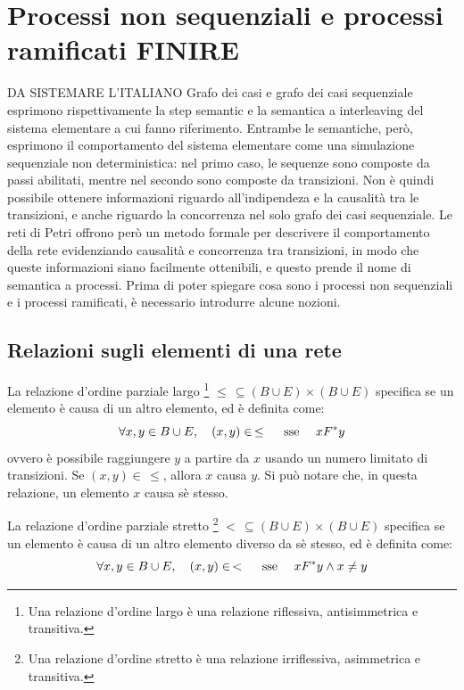 \section{Processi non sequenziali e processi ramificati FINIRE}
DA SISTEMARE L'ITALIANO
Grafo dei casi e grafo dei casi sequenziale esprimono rispettivamente
la step semantic e la semantica a interleaving del sistema elementare
a cui fanno riferimento.
Entrambe le semantiche, però, esprimono il comportamento del sistema
elementare come una simulazione sequenziale non deterministica: nel primo caso,
le sequenze sono composte da passi abilitati, mentre nel secondo sono composte
da transizioni. Non è quindi possibile ottenere informazioni riguardo
all'indipendeza e la causalità tra le transizioni, e anche riguardo la
concorrenza nel solo grafo dei casi sequenziale.
Le reti di Petri offrono però un metodo formale per descrivere il comportamento
della rete evidenziando causalità e concorrenza tra transizioni, in modo
che queste informazioni siano facilmente ottenibili, e questo prende
il nome di semantica a processi.
Prima di poter spiegare cosa sono i processi non sequenziali e i processi
ramificati, è necessario introdurre alcune nozioni.

\subsection*{Relazioni sugli elementi di una rete}
\begin{defn}
    La relazione d'ordine parziale largo \footnote{Una relazione d'ordine largo
    è una relazione riflessiva, antisimmetrica e transitiva.}
    $\le \, \subseteq (B \cup E) \times (B \cup E)$ specifica se un elemento
    è causa di un altro elemento, ed è definita come:
    \[
        \forall x, y \in B \cup E, \quad (x, y) \in \, \le \quad
        \textnormal{ sse } \quad x F^*y
    \]
    ovvero è possibile raggiungere $y$ a partire da $x$ usando un numero
    limitato di transizioni. Se $(x,y) \in \, \le$, allora $x$ causa $y$.
    Si può notare che, in questa relazione, un elemento $x$ causa sè stesso.
\end{defn}

\begin{defn}
    La relazione d'ordine parziale stretto \footnote{Una relazione d'ordine
    stretto è una relazione irriflessiva, asimmetrica e transitiva.}
    $< \, \subseteq (B \cup E) \times (B \cup E)$ specifica se un elemento
    è causa di un altro elemento diverso da sè stesso, ed è definita come:
    \[
        \forall x, y \in B \cup E, \quad (x, y) \in \, < \quad \textnormal{ sse } \quad
        x F^*y \land x \neq y
    \]
\end{defn}

